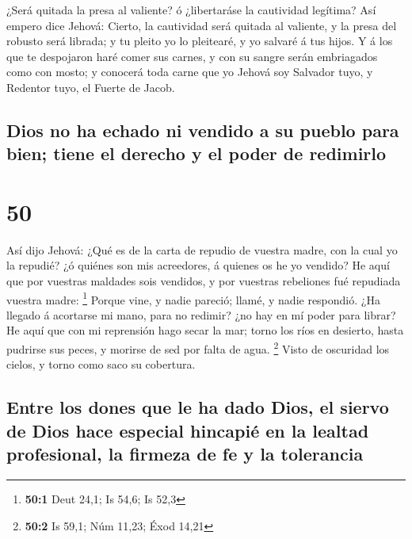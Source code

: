  ¿Será quitada la presa al valiente? ó ¿libertaráse la
cautividad legítima?  Así empero dice Jehová: Cierto, la
cautividad será quitada al valiente, y la presa del robusto será
librada; y tu pleito yo lo pleitearé, y yo salvaré á tus hijos.
 Y á los que te despojaron haré comer sus carnes, y con su
sangre serán embriagados como con mosto; y conocerá toda carne que yo
Jehová soy Salvador tuyo, y Redentor tuyo, el Fuerte de Jacob.

\hypertarget{dios-no-ha-echado-ni-vendido-a-su-pueblo-para-bien-tiene-el-derecho-y-el-poder-de-redimirlo}{%
\subsection{Dios no ha echado ni vendido a su pueblo para bien; tiene el
derecho y el poder de
redimirlo}\label{dios-no-ha-echado-ni-vendido-a-su-pueblo-para-bien-tiene-el-derecho-y-el-poder-de-redimirlo}}

\hypertarget{section-49}{%
\section{50}\label{section-49}}

 Así dijo Jehová: ¿Qué es de la carta de repudio de vuestra
madre, con la cual yo la repudié? ¿ó quiénes son mis acreedores, á
quienes os he yo vendido? He aquí que por vuestras maldades sois
vendidos, y por vuestras rebeliones fué repudiada vuestra madre:
\footnote{\textbf{50:1} Deut 24,1; Is 54,6; Is 52,3}  Porque
vine, y nadie pareció; llamé, y nadie respondió. ¿Ha llegado á acortarse
mi mano, para no redimir? ¿no hay en mí poder para librar? He aquí que
con mi reprensión hago secar la mar; torno los ríos en desierto, hasta
pudrirse sus peces, y morirse de sed por falta de agua. \footnote{\textbf{50:2}
  Is 59,1; Núm 11,23; Éxod 14,21}  Visto de oscuridad los
cielos, y torno como saco su cobertura.

\hypertarget{entre-los-dones-que-le-ha-dado-dios-el-siervo-de-dios-hace-especial-hincapiuxe9-en-la-lealtad-profesional-la-firmeza-de-fe-y-la-tolerancia}{%
\subsection{Entre los dones que le ha dado Dios, el siervo de Dios hace
especial hincapié en la lealtad profesional, la firmeza de fe y la
tolerancia}\label{entre-los-dones-que-le-ha-dado-dios-el-siervo-de-dios-hace-especial-hincapiuxe9-en-la-lealtad-profesional-la-firmeza-de-fe-y-la-tolerancia}}

